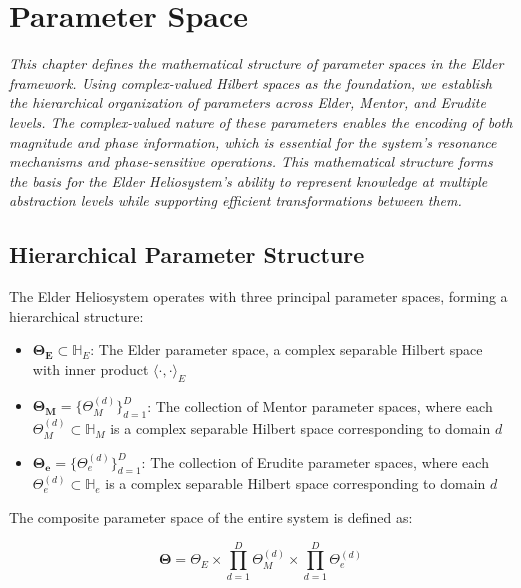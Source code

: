 \chapter{Parameter Space}

\textit{This chapter defines the mathematical structure of parameter spaces in the Elder framework. Using complex-valued Hilbert spaces as the foundation, we establish the hierarchical organization of parameters across Elder, Mentor, and Erudite levels. The complex-valued nature of these parameters enables the encoding of both magnitude and phase information, which is essential for the system's resonance mechanisms and phase-sensitive operations. This mathematical structure forms the basis for the Elder Heliosystem's ability to represent knowledge at multiple abstraction levels while supporting efficient transformations between them.}

\section{Hierarchical Parameter Structure}

\begin{definition}
The Elder Heliosystem operates with three principal parameter spaces, forming a hierarchical structure:

\begin{itemize}
    \item $\boldsymbol{\Theta_E} \subset \mathbb{H}_E$: The Elder parameter space, a complex separable Hilbert space with inner product $\langle \cdot, \cdot \rangle_E$
    
    \item $\boldsymbol{\Theta_M} = \{\Theta_M^{(d)}\}_{d=1}^D$: The collection of Mentor parameter spaces, where each $\Theta_M^{(d)} \subset \mathbb{H}_M$ is a complex separable Hilbert space corresponding to domain $d$
    
    \item $\boldsymbol{\Theta_e} = \{\Theta_e^{(d)}\}_{d=1}^D$: The collection of Erudite parameter spaces, where each $\Theta_e^{(d)} \subset \mathbb{H}_e$ is a complex separable Hilbert space corresponding to domain $d$
\end{itemize}

The composite parameter space of the entire system is defined as:

\begin{equation}
\boldsymbol{\Theta} = \Theta_E \times \prod_{d=1}^D \Theta_M^{(d)} \times \prod_{d=1}^D \Theta_e^{(d)}
\end{equation}
\end{definition}

